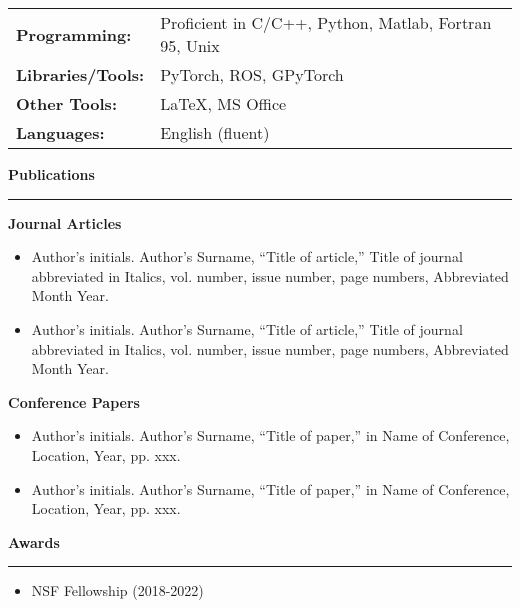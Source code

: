 \documentclass[10pt,letterpaper,hidelinks]{article}
\begin{document}
\begin{tabular}{m{8em} m{40em}}
\textbf{Programming:}     & Proficient in C/C++, Python, Matlab, Fortran 95, Unix\\
\textbf{Libraries/Tools:} & PyTorch, ROS, GPyTorch \\
\textbf{Other Tools:}     & LaTeX, MS Office\\
\textbf{Languages:}       & English (fluent)\\
\end{tabular} 



\vspace{0.1cm}
\begin{flushleft}
\large{\textbf{Publications}}
\vspace{0.1cm}
\hrule
\end{flushleft}

\textbf{Journal Articles}
\vspace{-0.1cm}
\begin{itemize}
	\setlength\itemsep{-0.1cm}
    \item Author’s initials. Author’s Surname, “Title of article,” Title of journal abbreviated in Italics, vol. number, issue number, page numbers, Abbreviated Month Year.
    \item Author’s initials. Author’s Surname, “Title of article,” Title of journal abbreviated in Italics, vol. number, issue number, page numbers, Abbreviated Month Year.
    \end{itemize}

\textbf{Conference Papers}
\vspace{-0.1cm}
\begin{itemize}
	\setlength\itemsep{-0.1cm}
	\item Author’s initials. Author’s Surname, “Title of paper,” in Name of Conference, Location, Year, pp. xxx.
	\item Author’s initials. Author’s Surname, “Title of paper,” in Name of Conference, Location, Year, pp. xxx.
    \end{itemize}



\vspace{-0.2cm}
\begin{flushleft}
\large{\textbf{Awards}}
\vspace{0.1cm}
\hrule
\end{flushleft}
\begin{itemize}
	\setlength\itemsep{-0.1cm}
	\item NSF Fellowship (2018-2022)
\end{itemize}
\end{document}
